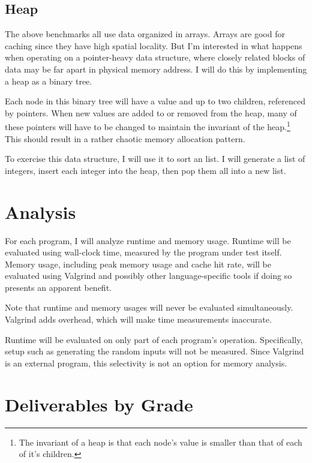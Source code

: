 \documentclass[12pt,letterpaper]{article}
\begin{document}
\subsection{Heap}

The above benchmarks all use data organized in arrays. Arrays are good for
caching since they have high spatial locality. But I'm interested in what
happens when operating on a pointer-heavy data structure, where closely related
blocks of data may be far apart in physical memory address. I will do this by
implementing a heap as a binary tree.

Each node in this binary tree will have a value and up to two children,
referenced by pointers. When new values are added to or removed from the heap,
many of these pointers will have to be changed to maintain the invariant of the
heap.\footnote{The invariant of a heap is that each node's value is smaller than
that of each of it's children.} This should result in a rather chaotic memory
allocation pattern.

To exercise this data structure, I will use it to sort an list. I will generate
a list of integers, insert each integer into the heap, then pop them all into a
new list.

\section{Analysis}

For each program, I will analyze runtime and memory usage. Runtime will be
evaluated using wall-clock time, measured by the program under test itself.
Memory usage, including peak memory usage and cache hit rate, will be evaluated
using Valgrind and possibly other language-specific tools if doing so presents
an apparent benefit.

Note that runtime and memory usages will never be evaluated simultaneously.
Valgrind adds overhead, which will make time measurements inaccurate.

Runtime will be evaluated on only part of each program's operation. Specifically,
setup such as generating the random inputs will not be measured. Since Valgrind
is an external program, this selectivity is not an option for memory analysis.

\section{Deliverables by Grade}
\end{document}
